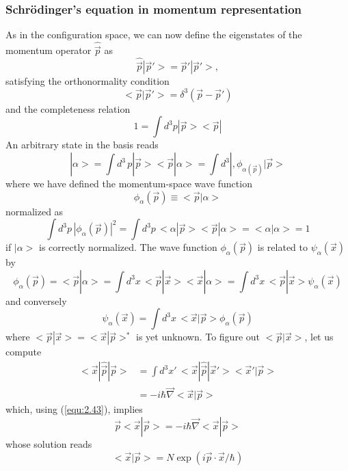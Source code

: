 \subsubsection{Schrödinger's equation in momentum
representation}
As in the configuration space, we can now define the
eigenstates of the momentum operator $\hat{\vec{p}}$ as
\begin{equation}
  \hat{\vec{p}} |\vec{p}'> = \vec{p}' |\vec{p}'>,
  \label{equ:2.43}
\end{equation}
satisfying the orthonormality condition
\begin{equation}
  <\vec{p}|\vec{p}'> = \delta^3(\vec{p}-\vec{p}')
  \label{equ:2.44}
\end{equation}
and the completeness relation
\begin{equation}
  1 = \int d^3 p |\vec{p}><\vec{p}|
  \label{equ:2.45}
\end{equation}
An arbitrary state in the basis reads
\begin{equation}
  |\alpha> = \int d^3\, p |\vec{p}><\vec{p}|\alpha> = \int d^3 |,
  \phi_{\alpha(\vec{p})}|\vec{p}>
  \label{equ:2.46}
\end{equation}
where we have defined the momentum-space wave function
\begin{equation}
  \phi_{\alpha} (\vec{p}) \equiv <\vec{p}|\alpha>
  \label{equ:2.47}
\end{equation}
normalized as
\begin{equation}
  \int d^3p \, |\phi_{\alpha}(\vec{p})|^2 = \int d^3p \,
  <\alpha|\vec{p}><\vec{p}|\alpha> = <\alpha|\alpha> = 1
  \label{equ:2.48}
\end{equation}
if $|\alpha>$ is correctly normalized.
The wave function $\phi_{\alpha} (\vec{p})$ is related to
$\psi_{\alpha}(\vec{x})$ by
\begin{equation}
  \phi_{\alpha}(\vec{p}) = <\vec{p}|\alpha> = \int d^3x \,
  <\vec{p}|\vec{x}><\vec{x}|\alpha> = \int d^3 x\,
  <\vec{p}|\vec{x}>\psi_{\alpha}(\vec{x})
  \label{equ:2.49}
\end{equation}
and conversely
\begin{equation}
  \psi_{\alpha}(\vec{x}) = \int d^3 x\, <\vec{x}|\vec{p}>
  \phi_{\alpha}(\vec{p})
  \label{equ:2.50}
\end{equation}
where $<\vec{p}|\vec{x}> = <\vec{x}|\vec{p}>^*$ is yet
unknown. To figure out $<\vec{p}|\vec{x}>$, let us compute
\begin{align}
  <\vec{x}|\hat{\vec{p}}|\vec{p}> &= \int d^3 x' \,
  <\vec{x}|\hat{\vec{p}}|\vec{x}'>
  <\vec{x}'|\vec{p}>\nonumber\\
  &= -i\hbar \vec{\nabla} <\vec{x}|\vec{p}> \label{equ:2.51}
\end{align}
which, using (\ref{equ:2.43}), implies
\begin{equation}
  \vec{p} <\vec{x}|\vec{p}> = -i \hbar
  \vec{\nabla}<\vec{x}|\vec{p}>
  \label{equ:2.52}
\end{equation}
whose solution reads
\begin{equation}
  <\vec{x}|\vec{p}> = N \exp(i \vec{p} \cdot \vec{x}/\hbar)
  \label{equ:2.53}
\end{equation}

